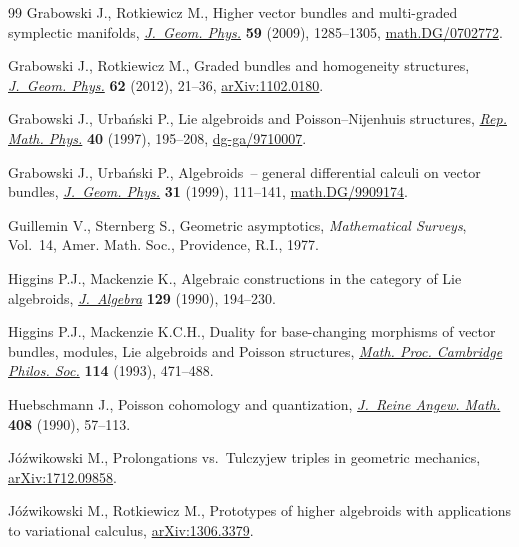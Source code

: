 \documentclass[pdftex]{sigma}
\numberwithin{equation}{section}
\theoremstyle{definition}
\begin{document}
\begin{thebibliography}{99}
Grabowski J., Rotkiewicz M., Higher vector bundles and multi-graded symplectic
 manifolds, \href{https://doi.org/10.1016/j.geomphys.2009.06.009}{\textit{J.~Geom. Phys.}} \textbf{59} (2009), 1285--1305,
 \href{https://arxiv.org/abs/math.DG/0702772}{math.DG/0702772}.

Grabowski J., Rotkiewicz M., Graded bundles and homogeneity structures,
 \href{https://doi.org/10.1016/j.geomphys.2011.09.004}{\textit{J.~Geom. Phys.}} \textbf{62} (2012), 21--36, \href{https://arxiv.org/abs/1102.0180}{arXiv:1102.0180}.

Grabowski J., Urba\'{n}ski P., Lie algebroids and {P}oisson--{N}ijenhuis
 structures, \href{https://doi.org/10.1016/S0034-4877(97)85916-2}{\textit{Rep. Math. Phys.}} \textbf{40} (1997), 195--208,
 \href{https://arxiv.org/abs/dg-ga/9710007}{dg-ga/9710007}.

Grabowski J., Urba\'{n}ski P., Algebroids~-- general differential calculi on
 vector bundles, \href{https://doi.org/10.1016/S0393-0440(99)00007-8}{\textit{J.~Geom. Phys.}} \textbf{31} (1999), 111--141,
 \href{https://arxiv.org/abs/math.DG/9909174}{math.DG/9909174}.

Guillemin V., Sternberg S., Geometric asymptotics, \textit{Mathematical
 Surveys}, Vol.~14, Amer. Math. Soc., Providence, R.I., 1977.

Higgins P.J., Mackenzie K., Algebraic constructions in the category of {L}ie
 algebroids, \href{https://doi.org/10.1016/0021-8693(90)90246-K}{\textit{J.~Algebra}} \textbf{129} (1990), 194--230.

Higgins P.J., Mackenzie K.C.H., Duality for base-changing morphisms of vector
 bundles, modules, {L}ie algebroids and {P}oisson structures, \href{https://doi.org/10.1017/S0305004100071760}{\textit{Math.
 Proc. Cambridge Philos. Soc.}} \textbf{114} (1993), 471--488.

Huebschmann J., Poisson cohomology and quantization, \href{https://doi.org/10.1515/crll.1990.408.57}{\textit{J.~Reine Angew.
 Math.}} \textbf{408} (1990), 57--113.

J\'{o}\'{z}wikowski M., Prolongations vs.~{T}ulczyjew triples in geometric
 mechanics, \href{https://arxiv.org/abs/1712.09858}{arXiv:1712.09858}.

J\'{o}\'{z}wikowski M., Rotkiewicz M., Prototypes of higher algebroids with
 applications to variational calculus, \href{https://arxiv.org/abs/1306.3379}{arXiv:1306.3379}.


\end{thebibliography}
\end{document}
